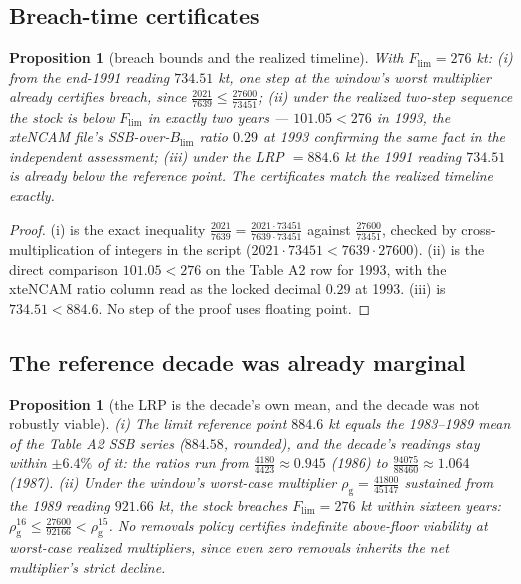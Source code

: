 \documentclass[10pt,twocolumn]{article}
\theoremstyle{plain}
\newtheorem{proposition}[theorem]{Proposition}
\theoremstyle{remark}
\begin{document}
\subsection{Breach-time certificates}\label{breach}

\begin{proposition}[breach bounds and the realized timeline]
\label{prop:breach}
With \(F_{\mathrm{lim}} = 276\) kt: (i) from the end-1991 reading
\(734.51\) kt, one step at the window's worst multiplier already
certifies breach, since
\(\tfrac{2021}{7639} \le \tfrac{27600}{73451}\); (ii) under the
realized two-step sequence the stock is below \(F_{\mathrm{lim}}\) in
exactly two years --- \(101.05 < 276\) in 1993, the xteNCAM file's
SSB-over-\(B_{\mathrm{lim}}\) ratio \(0.29\) at 1993 confirming the
same fact in the independent assessment; (iii) under the LRP
\(= 884.6\) kt the 1991 reading \(734.51\) is already below the
reference point. The certificates match the realized timeline exactly.
\end{proposition}

\begin{proof}
(i) is the exact inequality
\(\tfrac{2021}{7639} = \tfrac{2021 \cdot 73451}{7639 \cdot 73451}\)
against \(\tfrac{27600}{73451}\), checked by cross-multiplication of
integers in the script (\(2021 \cdot 73451 < 7639 \cdot 27600\)). (ii)
is the direct comparison \(101.05 < 276\) on the Table A2 row for 1993,
with the xteNCAM ratio column read as the locked decimal \(0.29\) at
1993. (iii) is \(734.51 < 884.6\). No step of the proof uses floating
point.
\end{proof}

\subsection{The reference decade was already marginal}\label{marginal}

\begin{proposition}[the LRP is the decade's own mean, and the decade
was not robustly viable]\label{prop:marginal}
(i) The limit reference point \(884.6\) kt equals the 1983--1989 mean
of the Table A2 SSB series (\(884.58\), rounded), and the decade's
readings stay within \(\pm 6.4\%\) of it: the ratios run from
\(\tfrac{4180}{4423} \approx 0.945\) (1986) to
\(\tfrac{94075}{88460} \approx 1.064\) (1987). (ii) Under the window's
worst-case multiplier \(\rho_{\mathrm{g}} = \tfrac{41800}{45147}\)
sustained from the 1989 reading \(921.66\) kt, the stock breaches
\(F_{\mathrm{lim}} = 276\) kt within sixteen years:
\(\rho_{\mathrm{g}}^{16} \le \tfrac{27600}{92166} < \rho_{\mathrm{g}}^{15}\).
No removals policy certifies indefinite above-floor viability at
worst-case realized multipliers, since even zero removals inherits the
net multiplier's strict decline.
\end{proposition}
\end{document}

